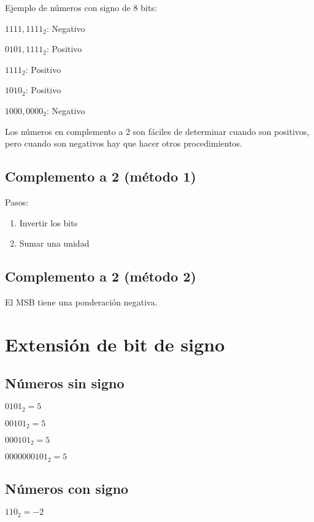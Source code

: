 \documentclass{article}
\begin{document}
\vspace{1em}
Ejemplo de números con signo de 8 bits:

\vspace{1em}
$1111,1111_{2}$: Negativo

$0101,1111_{2}$: Positivo

$1111_{2}$: Positivo

$1010_{2}$: Positivo

$1000,0000_{2}$: Negativo

\vspace{1em}
Los números en complemento a  2 son fáciles de determinar cuando son positivos,
pero cuando son negativos hay que hacer otros procedimientos.

\subsection{Complemento a 2 (método 1)}

Pasos:

\begin{enumerate}
	\item
		Invertir los bits
	\item
		Sumar una unidad
\end{enumerate}

\subsection{Complemento a 2 (método 2)}

El MSB tiene una ponderación negativa.

\section{Extensión de bit de signo}

\subsection{Números sin signo}

$0101_{2} = 5$

$00101_{2} = 5$

$000101_{2} = 5$

$0000000101_{2} = 5$

\subsection{Números con signo}

$110_{2} = -2$
\end{document}
